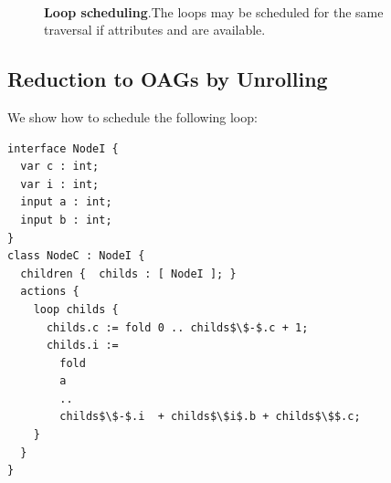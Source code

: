 \begin{figure}
\centering
{}\\
\caption{\textbf{Loop scheduling}.The loops may be scheduled for the same traversal if attributes  and  are available.}
\label{fig:unrolling}
\end{figure}



\subsection{Reduction to OAGs by Unrolling}
We show how to schedule the following loop:

\begin{lstlisting}[mathescape]
interface NodeI {
  var c : int;
  var i : int;
  input a : int;
  input b : int;
}
class NodeC : NodeI {
  children {  childs : [ NodeI ]; }
  actions {
    loop childs {
      childs.c := fold 0 .. childs$\$-$.c + 1;
      childs.i := 
        fold 
        a 
        ..         
        childs$\$-$.i  + childs$\$i$.b + childs$\$$.c;
    }
  }
}
\end{lstlisting}


